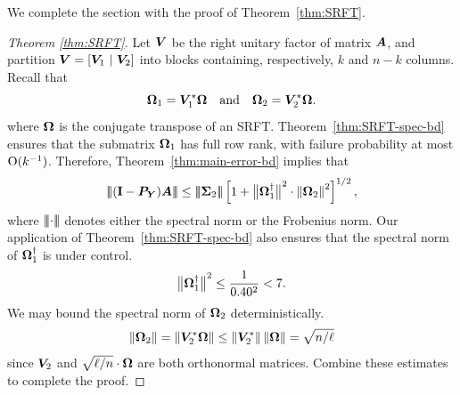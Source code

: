 \documentclass[final]{siamltex}
\newcommand{\pgnotate}[1]{{\color{blue}[#1]}}
\newcommand{\notate}[1]{\textcolor{red}{\textbf{[#1]}}}
\begin{document}





We complete the section with the proof of Theorem~\ref{thm:SRFT}.

\lsp

\begin{proof}[Theorem \ref{thm:SRFT}]
Let $\bm{V}$ be the right unitary factor of matrix $\bm{A}$, and
partition $\bm{V} = [ \bm{V}_1 \ | \ \bm{V}_2 ]$ into blocks
containing, respectively, $k$ and $n - k$ columns.  Recall that
$$
\bm{\Omega}_1 = \bm{V}_1^* \bm{\Omega} \quad\text{and}\quad
\bm{\Omega}_2 = \bm{V}_2^* \bm{\Omega}.
$$
where $\bm{\Omega}$ is the conjugate transpose of an SRFT.
Theorem~\ref{thm:SRFT-spec-bd} ensures that the submatrix $\bm{\Omega}_1$
has full row rank, with failure probability at most $\mathrm{O}(k^{-1})$.
Therefore, Theorem~\ref{thm:main-error-bd} implies that
$$
\triplenorm{ (\Id - \mtx{P}_{\mtx{Y}}) \mtx{A} }
    \leq \triplenorm{\mtx{\Sigma}_2} \left[ 1 + \smnorm{}{ \mtx{\Omega}_1^\psinv }^2 \cdot
        \normsq{ \mtx{\Omega}_2 } \right]^{1/2},
$$
where $\left\vert\!\left\vert\!\left\vert {\cdot} \right\vert\!\right\vert\!\right\vert$ denotes either the spectral norm or the Frobenius norm.
Our application of Theorem~\ref{thm:SRFT-spec-bd} also ensures that the
spectral norm of $\bm{\Omega}_1^\dagger$ is under control.
$$
{\bigl\Vert { \bm{\Omega}_1^\dagger} \bigr\Vert}_{}^2 \leq \frac{1}{0.40^2} < 7.
$$
We may bound the spectral norm of $\bm{\Omega}_2$ deterministically.
$$
\left\Vert {\bm{\Omega}_2} \right\Vert = \left\Vert { \bm{V}_2^*\bm{\Omega} } \right\Vert
    \leq \left\Vert { \bm{V}_2^*} \right\Vert \left\Vert { \bm{\Omega} } \right\Vert
    = \sqrt{n/\ell}
$$
since $\bm{V}_2$ and $\sqrt{\ell/n} \cdot \bm{\Omega}$ are both orthonormal matrices.
Combine these estimates to complete the proof.
\end{proof}
\end{document}
